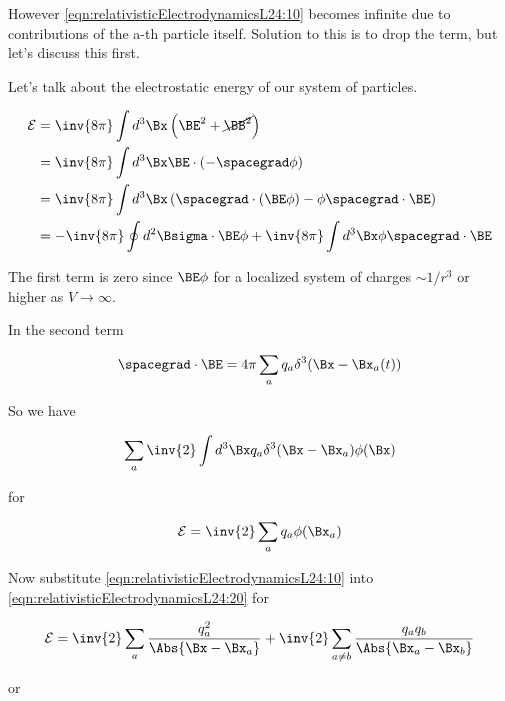 However \ref{eqn:relativisticElectrodynamicsL24:10} becomes infinite due to contributions of the a-th particle itself.  Solution to this is to drop the term, but let's discuss this first.

Let's talk about the electrostatic energy of our system of particles.

\begin{align*}
\mathcal{E} 
&= \inv{8 \pi} \int d^3 \Bx \left(\BE^2 + \cancel{\BB^2} \right) \\
&= \inv{8 \pi} \int d^3 \Bx \BE \cdot (-\spacegrad \phi) \\
&= \inv{8 \pi} \int d^3 \Bx \left( \spacegrad \cdot (\BE \phi) - \phi \spacegrad \cdot \BE \right) \\
&= -\inv{8 \pi} \oint d^2 \Bsigma \cdot \BE \phi + \inv{8 \pi} \int d^3 \Bx \phi \spacegrad \cdot \BE  \\
\end{align*}

The first term is zero since $\BE \phi$ for a localized system of charges $\sim 1/r^3$ or higher as $V \rightarrow \infty$.

In the second term 

\begin{equation}\label{eqn:relativisticElectrodynamicsL24:250}
\spacegrad \cdot \BE = 
4 \pi \sum_a q_a \delta^3(\Bx - \Bx_a(t))
\end{equation}

So we have 

\begin{equation}\label{eqn:relativisticElectrodynamicsL24:270}
\sum_a \inv{2} \int d^3 \Bx q_a \delta^3(\Bx - \Bx_a) \phi(\Bx)
\end{equation}

for

\begin{equation}\label{eqn:relativisticElectrodynamicsL24:20}
\mathcal{E} 
= \inv{2} \sum_a q_a \phi(\Bx_a)
\end{equation}

Now substitute \ref{eqn:relativisticElectrodynamicsL24:10} into \ref{eqn:relativisticElectrodynamicsL24:20} for

\begin{equation}\label{eqn:relativisticElectrodynamicsL24:290}
\mathcal{E} = \inv{2} \sum_a \frac{q_a^2}{\Abs{\Bx - \Bx_a}} + \inv{2} \sum_{a \ne b} \frac{q_a q_b}{\Abs{\Bx_a - \Bx_b}}
\end{equation}

or

